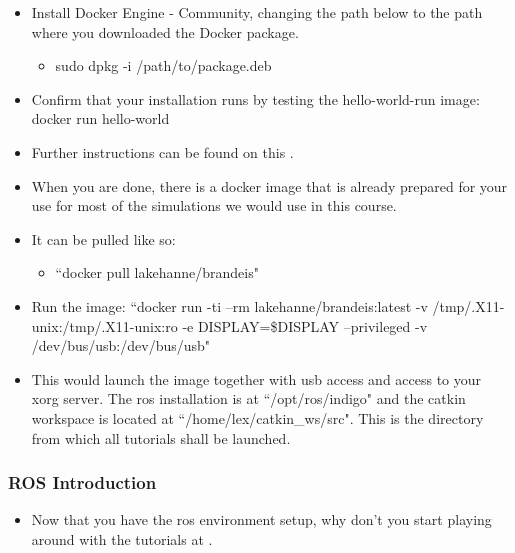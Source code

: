 \begin{frame}
	\begin{itemize}
		\item Install Docker Engine - Community, changing the path below to the path where you downloaded the Docker package.
		\vspace{.5em}
		\begin{itemize}
			\item \textsf{sudo dpkg -i /path/to/package.deb}
		\end{itemize}
		\item Confirm that your installation runs by testing the \textsf{hello-world-run} image:
			\textsf{docker run hello-world}
			\vspace{.5em}
		\item Further instructions can be found on this \href{https://docs.docker.com/install/linux/docker-ce/ubuntu/}{}.
	\end{itemize}
\end{frame}

\begin{frame}
\begin{itemize}
	\item When you are done, there is a docker image that is already prepared for your use for most of the simulations we would use in this course.
	\vspace{.5em}
	\item It can be pulled like so:
	\vspace{.5em}
	\begin{itemize}
		\small \item \textsf{``docker pull lakehanne/brandeis"}
	\end{itemize}
	\vspace{.5em}
	\item Run the image:
	\vspace{.5em}
	\small \textsf{``docker run -ti --rm lakehanne/brandeis:latest -v /tmp/.X11-unix:/tmp/.X11-unix:ro -e DISPLAY=\$DISPLAY --privileged -v /dev/bus/usb:/dev/bus/usb"}
	\vspace{.5em}
	\item This would launch the image together with usb access and access to your xorg server.  The ros installation is at \textsf{``/opt/ros/indigo"} and the catkin workspace is located at \textsf{``/home/lex/catkin\_ws/src"}. This is the directory from which all tutorials shall be launched.
\end{itemize}
\end{frame}

\begin{frame}
\frametitle{ROS Introduction}
	\begin{itemize}
		\item Now that you have the ros environment setup, why don't you start playing around with the tutorials at \textsf{\href{http://wiki.ros.org/ROS/Tutorials}{}}.
	\end{itemize}
\end{frame}
